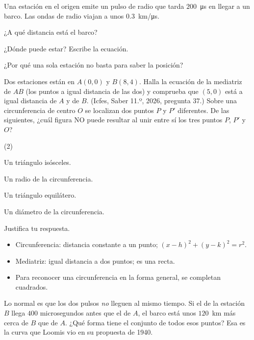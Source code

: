 \documentclass[11pt]{article}
\begin{document}
\begin{preguntas}
\pregunta Una estación en el origen emite un pulso de radio que tarda
$200$~\unit{\micro\second} en llegar a un barco. Las ondas de radio viajan a unos
$\num{0,3}$~km/\unit{\micro\second}.
\begin{opciones}
  \item ¿A qué distancia está el barco?
  \item ¿Dónde puede estar? Escribe la ecuación.
  \item ¿Por qué una sola estación no basta para saber la posición?
\end{opciones}
\espacio{3cm}
\pregunta Dos estaciones están en $A(0, 0)$ y $B(8, 4)$. Halla la ecuación de la
mediatriz de $AB$ (los puntos a igual distancia de las dos) y comprueba que $(5, 0)$
está a igual distancia de $A$ y de $B$.
\espacio{3cm}
\pregunta (Icfes, Saber 11.º, 2026, pregunta 37.) Sobre una circunferencia de centro
$O$ se localizan dos puntos $P$ y $P'$ diferentes. De las siguientes, ¿cuál figura NO
puede resultar al unir entre sí los tres puntos $P$, $P'$ y $O$?
\begin{opciones*}(2)
  \item Un triángulo isósceles.
  \item Un radio de la circunferencia.
  \item Un triángulo equilátero.
  \item Un diámetro de la circunferencia.
\end{opciones*}
Justifica tu respuesta.
\end{preguntas}

\begin{resumen}
\begin{itemize}
  \item Circunferencia: distancia constante a un punto; $(x - h)^2 + (y - k)^2 = r^2$.
  \item Mediatriz: igual distancia a dos puntos; es una recta.
  \item Para reconocer una circunferencia en la forma general, se completan cuadrados.
\end{itemize}
\end{resumen}

\label{tema:hiperbola}

\begin{hilo}
Lo normal es que los dos pulsos \emph{no} lleguen al mismo tiempo. Si el de la
estación $B$ llega $400$ microsegundos antes que el de $A$, el barco está unos
$120$~km más cerca de $B$ que de $A$. ¿Qué forma tiene el conjunto de todos esos
puntos? Esa es la curva que Loomis vio en su propuesta de 1940.
\end{hilo}
\end{document}
